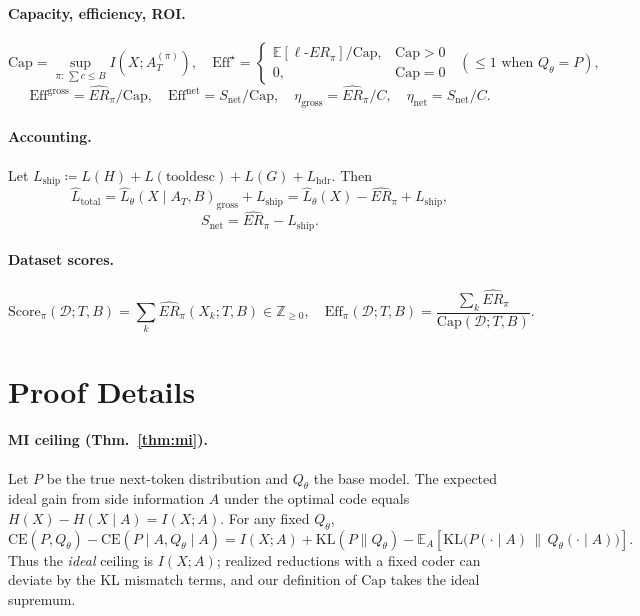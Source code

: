 \documentclass[12pt,a4paper]{article}
\newcommand{\ERideal}{\ell\text{-}ER}
\begin{document}
\paragraph{Capacity, efficiency, ROI.}
\[
\mathrm{Cap} = \sup_{\pi:\,\sum c\le B} I(X;A_T^{(\pi)}),
\quad
\mathrm{Eff}^\star = \begin{cases}\mathbb{E}[\ERideal_\pi]/\mathrm{Cap},&\mathrm{Cap}>0\\ 0,&\mathrm{Cap}=0\end{cases}\;\;(\le 1\text{ when }Q_\theta=P),
\]
\[
\mathrm{Eff}^{\mathrm{gross}}=\widehat{ER}_\pi/\mathrm{Cap},\quad 
\mathrm{Eff}^{\mathrm{net}}=S_{\text{net}}/\mathrm{Cap},\quad
\eta_{\text{gross}}=\widehat{ER}_\pi/C,\quad
\eta_{\text{net}}=S_{\text{net}}/C.
\]
\paragraph{Accounting.}
Let $L_{\mathrm{ship}}\coloneqq L(H)+L(\text{tooldesc})+L(G)+L_{\mathrm{hdr}}$. Then
\[
\widehat{L}_{\text{total}} = \widehat{L}_\theta(X\mid A_T,B)_{\mathrm{gross}} + L_{\mathrm{ship}} = \widehat{L}_\theta(X) - \widehat{ER}_\pi + L_{\mathrm{ship}},
\]
\[
S_{\text{net}}=\widehat{ER}_\pi - L_{\mathrm{ship}}.
\]
\paragraph{Dataset scores.}
\[
\mathrm{Score}_\pi(\mathcal{D};T,B) = \sum_k \widehat{ER}_\pi(X_k;T,B)\in \mathbb{Z}_{\ge 0},\quad
\mathrm{Eff}_\pi(\mathcal{D};T,B)=\frac{\sum_k \widehat{ER}_\pi}{\mathrm{Cap}(\mathcal{D};T,B)}.
\]

\section{Proof Details}
\paragraph{MI ceiling (Thm.~\ref{thm:mi}).}
Let $P$ be the true next-token distribution and $Q_\theta$ the base model. The expected ideal gain from side information $A$ under the optimal code equals $H(X)-H(X\mid A) = I(X;A)$. For any fixed $Q_\theta$,
\[
\mathrm{CE}(P,Q_\theta)-\mathrm{CE}(P\!\mid\!A,Q_\theta\!\mid\!A)
= I(X;A)+\mathrm{KL}(P\|Q_\theta)-\mathbb{E}_A\!\left[\mathrm{KL}\big(P(\cdot\!\mid\!A)\,\|\,Q_\theta(\cdot\!\mid\!A)\big)\right].
\]
Thus the \emph{ideal} ceiling is $I(X;A)$; realized reductions with a fixed coder can deviate by the KL mismatch terms, and our definition of $\mathrm{Cap}$ takes the ideal supremum.
\end{document}
